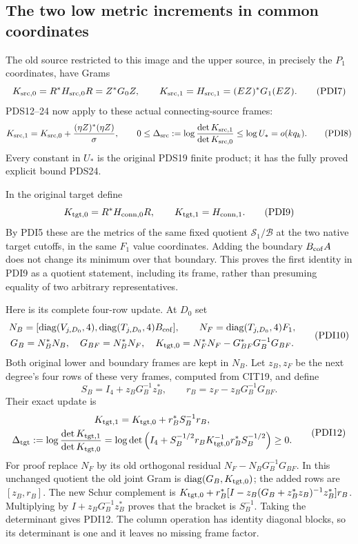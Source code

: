 \documentclass[10pt]{article}
\begin{document}
\subsection{The two low metric increments in common coordinates}

The old source restricted to this image and the upper source,
in precisely the $P_1$ coordinates, have Grams
\[
 K_{{\rm src},0}=R^*H_{{\rm src},0}R=Z^*G_0Z,\qquad
 K_{{\rm src},1}=H_{{\rm src},1}=(EZ)^*G_1(EZ).
 \tag{PDI7}
\]
PDS12--24 now apply to these actual connecting-source frames:
\[
 K_{{\rm src},1}=K_{{\rm src},0}
       +\frac{(\eta Z)^*(\eta Z)}{\sigma},\qquad
 0\le\Delta_{\rm src}:=
        \log\frac{\det K_{{\rm src},1}}{\det K_{{\rm src},0}}
       \le\log U_*=o(kq_k).
 \tag{PDI8}
\]
Every constant in $U_*$ is the original PDS19 finite product;
it has the fully proved explicit bound PDS24.

In the original target define
\[
 K_{{\rm tgt},0}=R^*H_{{\rm conn},0}R,\qquad
 K_{{\rm tgt},1}=H_{{\rm conn},1} .
 \tag{PDI9}
\]
By PDI5 these are the metrics of the same fixed quotient
$\mathscr S_1/\mathscr B$ at the two native target cutoffs,
in the same $F_1$ value coordinates. Adding the boundary
$B_{\rm cof}A$ does not change its minimum over that boundary.
This proves the first identity in PDI9 as a quotient statement,
including its frame, rather than presuming equality of two
arbitrary representatives.

Here is its complete four-row update. At $D_0$ set
\[
 \begin{gathered}
 N_B=[\operatorname{diag}(V_{j,D_0},4),
             \operatorname{diag}(T_{j,D_0},4)B_{\rm cof}],\qquad
 N_F=\operatorname{diag}(T_{j,D_0},4)F_1,\\
 G_B=N_B^*N_B,\quad G_{BF}=N_B^*N_F,\quad
 K_{{\rm tgt},0}=N_F^*N_F-G_{BF}^*G_B^{-1}G_{BF} .
 \end{gathered}\tag{PDI10}
\]
Both original lower and boundary frames are kept in $N_B$.
Let $z_B,z_F$ be the next degree's four rows of these very
frames, computed from CIT19, and define
\[
 S_B=I_4+z_BG_B^{-1}z_B^*,\qquad
 r_B=z_F-z_BG_B^{-1}G_{BF} .
 \tag{PDI11}
\]
Their exact update is
\[
 \begin{gathered}
 K_{{\rm tgt},1}=K_{{\rm tgt},0}+r_B^*S_B^{-1}r_B,\\
 \Delta_{\rm tgt}:=
 \log\frac{\det K_{{\rm tgt},1}}{\det K_{{\rm tgt},0}}
 =\log\det\left(I_4+
 S_B^{-1/2}r_BK_{{\rm tgt},0}^{-1}r_B^*S_B^{-1/2}\right)\ge0 .
 \end{gathered}\tag{PDI12}
\]
For proof replace $N_F$ by its old orthogonal residual
$N_F-N_BG_B^{-1}G_{BF}$. In this unchanged quotient the old
joint Gram is $\operatorname{diag}(G_B,K_{{\rm tgt},0})$;
the added rows are $[z_B,r_B]$. The new Schur complement is
$K_{{\rm tgt},0}+r_B^*[I-z_B(G_B+z_B^*z_B)^{-1}z_B^*]r_B$.
Multiplying by $I+z_BG_B^{-1}z_B^*$ proves that the bracket
is $S_B^{-1}$. Taking the determinant gives PDI12. The column
operation has identity diagonal blocks, so its determinant is
one and it leaves no missing frame factor.
\end{document}
